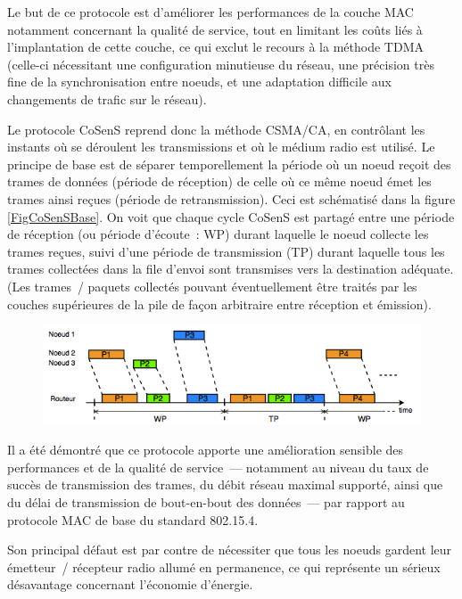 Le but de ce protocole est d'améliorer les performances de la couche
MAC notamment concernant la qualité de service, tout en limitant les coûts
liés à l'implantation de cette couche, ce qui exclut le recours à la
méthode TDMA (celle-ci nécessitant une configuration minutieuse
du réseau, une précision très fine de la synchronisation entre noeuds,
et une adaptation difficile aux changements de trafic sur le réseau).

Le protocole CoSenS reprend donc la méthode CSMA/CA, en contrôlant
les instants où se déroulent les transmissions et où le médium radio
est utilisé. Le principe de base est de séparer temporellement la période
où un noeud reçoit des trames de données (période de réception) de celle
où ce même noeud émet les trames ainsi reçues (période de retransmission).
Ceci est schématisé dans la figure \vref{FigCoSenSBase}. On voit que
chaque cycle CoSenS est partagé entre une période de réception (ou période
d'écoute~: WP) durant laquelle le noeud collecte les trames reçues,
suivi d'une période de transmission (TP) durant laquelle tous les trames
collectées dans la file d'envoi sont transmises vers la destination
adéquate. (Les trames~/ paquets collectés pouvant éventuellement être
traités par les couches supérieures de la pile de façon arbitraire
entre réception et émission).

\begin{figure}[!hbt]
\centering
\includegraphics[width=12.5cm]{images/ch3-cosens-base.png}
\label{FigCoSenSBase}
\end{figure}

Il a été démontré que ce protocole apporte une amélioration sensible
des performances et de la qualité de service~--- notamment au niveau
du taux de succès de transmission des trames, du débit réseau maximal
supporté, ainsi que du délai de transmission de bout-en-bout des données~---
par rapport au protocole MAC de base du standard 802.15.4.

\newpage

Son principal défaut est par contre de nécessiter que tous les noeuds
gardent leur émetteur~/ récepteur radio allumé en permanence, ce qui
représente un sérieux désavantage concernant l'économie d'énergie.

